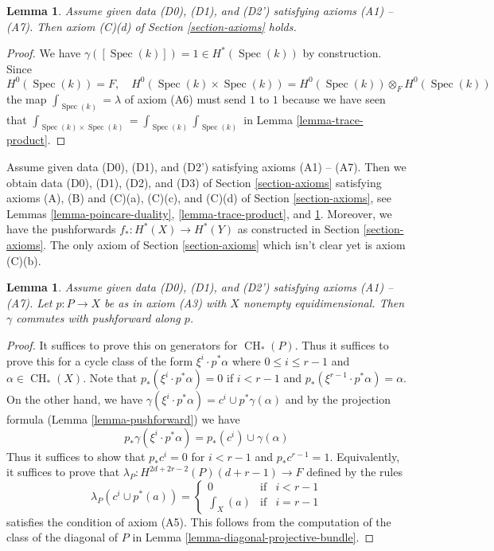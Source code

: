 \documentclass{stacks-project}
\theoremstyle{plain}
\newtheorem{lemma}[subsection]{Lemma}
\theoremstyle{definition}
\theoremstyle{remark}
\numberwithin{equation}{subsection}
\def\Spec{\mathop{\mathrm{Spec}}}
\def\CH{\mathop{\mathrm{CH}}\nolimits}
\begin{document}
\begin{lemma}
\label{lemma-trace-base}
Assume given data (D0), (D1), and (D2') satisfying axioms (A1) -- (A7).
Then axiom (C)(d) of Section \ref{section-axioms} holds.
\end{lemma}

\begin{proof}
We have $\gamma([\Spec(k)]) = 1 \in H^*(\Spec(k))$ by construction.
Since
$$
H^0(\Spec(k)) = F,\quad
H^0(\Spec(k) \times \Spec(k)) = H^0(\Spec(k)) \otimes_F H^0(\Spec(k))
$$
the map $\int_{\Spec(k)} = \lambda$ of axiom (A6) must send $1$ to $1$
because we have seen that
$\int_{\Spec(k) \times \Spec(k)} = \int_{\Spec(k)} \int_{\Spec(k)}$
in Lemma \ref{lemma-trace-product}.
\end{proof}

\noindent
Assume given data (D0), (D1), and (D2') satisfying axioms (A1) -- (A7).
Then we obtain data (D0), (D1), (D2), and (D3) of
Section \ref{section-axioms}
satisfying axioms (A), (B) and (C)(a), (C)(c), and (C)(d)
of Section \ref{section-axioms}, see
Lemmas \ref{lemma-poincare-duality}, \ref{lemma-trace-product}, and
\ref{lemma-trace-base}.
Moreover, we have the pushforwards $f_* : H^*(X) \to H^*(Y)$
as constructed in Section \ref{section-axioms}. The only axiom of
Section \ref{section-axioms}
which isn't clear yet is axiom (C)(b).

\begin{lemma}
\label{lemma-ok-for-projective-bundle}
Assume given data (D0), (D1), and (D2') satisfying axioms (A1) -- (A7).
Let $p : P \to X$ be as in axiom (A3) with $X$ nonempty equidimensional.
Then $\gamma$ commutes with pushforward along $p$.
\end{lemma}

\begin{proof}
It suffices to prove this on generators for $\CH_*(P)$.
Thus it suffices to prove this for a cycle class of the
form $\xi^i \cdot p^*\alpha$ where $0 \leq i \leq r - 1$
and $\alpha \in \CH_*(X)$. Note that $p_*(\xi^i \cdot p^*\alpha) = 0$
if $i < r - 1$ and $p_*(\xi^{r - 1} \cdot p^*\alpha) = \alpha$.
On the other hand, we have
$\gamma(\xi^i \cdot p^*\alpha) = c^i \cup p^*\gamma(\alpha)$
and by the projection formula (Lemma \ref{lemma-pushforward})
we have
$$
p_*\gamma(\xi^i \cdot p^*\alpha) = p_*(c^i) \cup \gamma(\alpha)
$$
Thus it suffices to show that $p_*c^i = 0$ for $i < r - 1$ and
$p_*c^{r - 1} = 1$. Equivalently, it suffices to prove that
$\lambda_P : H^{2d + 2r - 2}(P)(d + r - 1) \to F$ defined by
the rules
$$
\lambda_P(c^i \cup p^*(a)) =
\left\{
\begin{matrix}
0 & \text{if} & i < r - 1 \\
\int_X(a) & \text{if} & i = r - 1
\end{matrix}
\right.
$$
satisfies the condition of axiom (A5). This follows from the
computation of the class of the diagonal of $P$ in
Lemma \ref{lemma-diagonal-projective-bundle}.
\end{proof}
\end{document}
